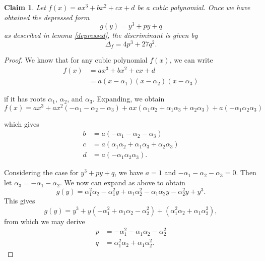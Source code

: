 \documentclass[12pt]{amsart}
\newtheorem{clm}{Claim}
\theoremstyle{case}
\begin{document}
	
	
	\begin{clm}
		Let $f(x) = ax^3 + bx^2 + cx + d$ be a cubic polynomial. Once we have obtained the depressed form $$ g(y) = y^3 + py + q $$ as described in lemma \ref{depressed}, the discriminant is given by
		$$\Delta_f = 4 p^3 + 27 q^2 . $$
	\end{clm}

	\begin{proof}
		
		We know that for any cubic polynomial $f(x)$, we can write
		\begin{equation*}
		\begin{split}
		f(x) & = ax^3 + bx^2 + cx + d \\
		     & = a (x-\alpha_1)(x-\alpha_2)(x-\alpha_3)
		\end{split}
		\end{equation*}
		
		if it has roots $\alpha_1$, $\alpha_2$, and $\alpha_3$. Expanding, we obtain
		$$ f(x) = ax^3 + ax^2 (-\alpha_1-\alpha_2-\alpha_3) + ax (\alpha_1\alpha_2+\alpha_1\alpha_3+\alpha_2\alpha_3) + a(-\alpha_1\alpha_2\alpha_3) $$
		
		which gives
		\begin{equation*}
		\begin{split}
		b & = a (-\alpha_1-\alpha_2-\alpha_3) \\
		c & = a (\alpha_1\alpha_2+\alpha_1\alpha_3+\alpha_2\alpha_3) \\
		d & = a (-\alpha_1\alpha_2\alpha_3) .
		\end{split}
		\end{equation*}
		
		Considering the case for $ y^3 + py + q $, we have $a = 1$ and $-\alpha_1-\alpha_2-\alpha_3 = 0$. Then let $\alpha_3 = - \alpha_1 - \alpha_2$. We now can expand as above to obtain
		$$ g(y) = \alpha_1^2\alpha_2 - \alpha_1^2 y + \alpha_1\alpha_2^2 - \alpha_1\alpha_2 y - \alpha_2^2 y + y^3 . $$
		This gives
		$$ g(y) = y^3 + y (-\alpha_1^2 + \alpha_1\alpha_2 - \alpha_2^2) + (\alpha_1^2\alpha_2 + \alpha_1\alpha_2^2) , $$
		from which we may derive
		\begin{equation*}
		\begin{split}
		p & = -\alpha_1^2 - \alpha_1\alpha_2 - \alpha_2^2 \\
		q & = \alpha_1^2\alpha_2 + \alpha_1\alpha_2^2 .
		\end{split}
		\end{equation*}
		

\end{proof}
\end{document}
